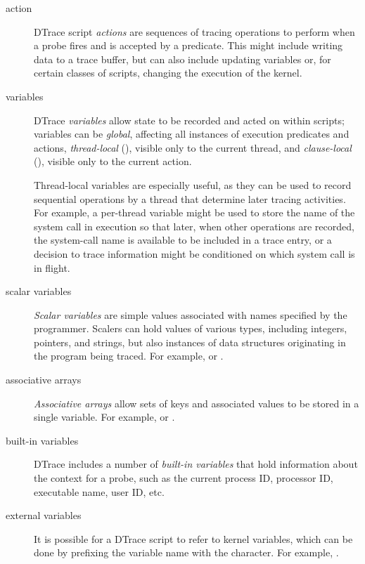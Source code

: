 \documentclass[a4paper,10pt]{article}
\begin{document}
\begin{description}
\item[action] DTrace script \textit{actions} are sequences of tracing
  operations to perform when a probe fires and is accepted by a predicate.
  This might include writing data to a trace buffer, but can also include
  updating variables or, for certain classes of scripts, changing the
  execution of the kernel.

\item[variables] DTrace \textit{variables} allow state to be recorded and
  acted on within scripts; variables can be \textit{global}, affecting all
  instances of execution predicates and actions, \textit{thread-local}
  (), visible only to the current thread, and
  \textit{clause-local} (), visible only to the current action.

  Thread-local variables are especially useful, as they can be used to record
  sequential operations by a thread that determine later tracing activities.
  For example, a per-thread variable might be used to store the name of the
  system call in execution so that later, when other operations are recorded,
  the system-call name is available to be included in a trace entry, or a
  decision to trace information might be conditioned on which system call is
  in flight.

\item[scalar variables] \textit{Scalar variables} are simple values
  associated with names specified by the programmer.
  Scalers can hold values of various types, including integers, pointers, and
  strings, but also instances of data structures originating in the program
  being traced.
  For example,  or .

\item[associative arrays] \textit{Associative arrays} allow sets of keys and
  associated values to be stored in a single variable.
  For example,  or
  .

\item[built-in variables] DTrace includes a number of \textit{built-in
  variables} that hold information about the context for a probe, such as the
  current process ID, processor ID, executable name, user ID, etc.

\item[external variables] It is possible for a DTrace script to refer to
  kernel variables, which can be done by prefixing the variable name with the
   character.
  For example, .


\end{description}
\end{document}

